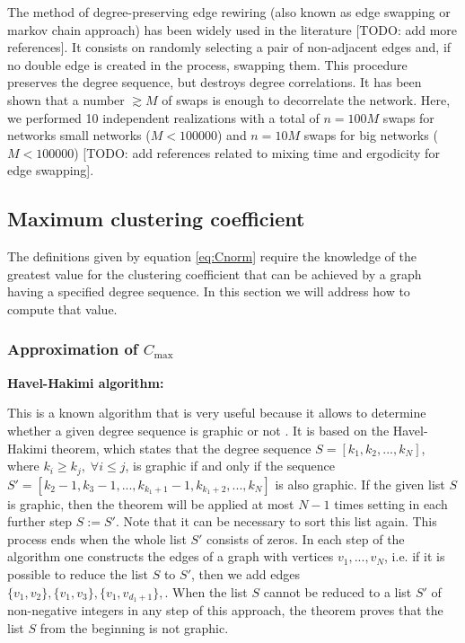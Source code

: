 \documentclass{article}
\begin{document}
The method of degree-preserving edge rewiring (also known as edge swapping or markov chain approach) has been widely used in the literature \cite{Orsini2015QuantifyingNetworks} [TODO: add more references]. It consists on randomly selecting a pair of non-adjacent edges and, if no double edge is created in the process, swapping them. This procedure preserves the degree sequence, but destroys degree correlations. It has been shown that a number $\gtrsim M$ of swaps is enough to decorrelate the network. Here, we performed 10 independent realizations with a total of $n = 100 M$ swaps for networks small networks ($M < 100000$) and  $n = 10 M$ swaps for big networks ($M < 100000$) [TODO: add references related to mixing time and ergodicity for edge swapping]. 

\subsection{Maximum clustering coefficient}

The definitions given by equation \ref{eq:Cnorm} require the knowledge of the greatest value for the clustering coefficient that can be achieved by a graph having a specified degree sequence. In this section we will address how to compute that value.

\subsubsection{Approximation of $C_{\mathrm{max}}$} \label{sec:intro_Cmax}

{\bf Havel-Hakimi algorithm:}

This is a known algorithm that is very useful because it allows to determine whether a given degree sequence is graphic or not \cite{Hakimi1962}. It is based on the Havel-Hakimi theorem, which states that the degree sequence $S = [k_1, k_2, ..., k_N]$, where $k_i \geq k_j,\; \forall i\leq j$, is graphic if and only if the sequence $S' = [k_2-1, k_3-1, ..., k_{k_1+1}-1, k_{k_1+2} ,..., k_N]$ is also graphic. If the given list $S$ is graphic, then the theorem will be applied at most $N-1$ times setting in each further step $S:=S'$. Note that it can be necessary to sort this list again. This process ends when the whole list $S'$ consists of zeros. In each step of the algorithm one constructs the edges of a graph with vertices $v_1, ..., v_N$, i.e. if it is possible to reduce the list $S$ to $S'$, then we add edges $\lbrace v_1, v_2 \rbrace, \lbrace v_1, v_3 \rbrace, \lbrace v_1, v_{d_1+1} \rbrace,$. When the list $S$ cannot be reduced to a list $S'$ of non-negative integers in any step of this approach, the theorem proves that the list $S$ from the beginning is not graphic.
\end{document}
